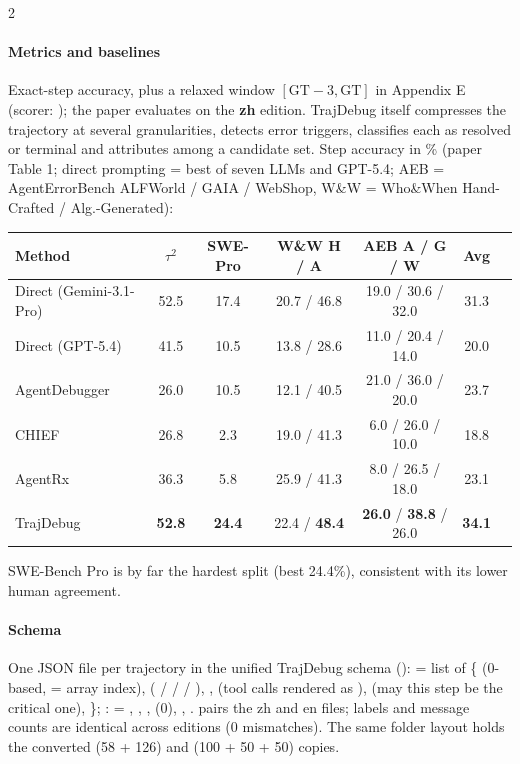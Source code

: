 \begin{multicols}{2}
\paragraph{Metrics and baselines} Exact-step accuracy, plus a relaxed window $[\mathrm{GT}{-}3, \mathrm{GT}]$ in Appendix E (scorer: ); the paper evaluates on the \textbf{zh} edition. TrajDebug itself compresses the trajectory at several granularities, detects error triggers, classifies each as resolved or terminal and attributes among a candidate set. Step accuracy in \% (paper Table 1; direct prompting = best of seven LLMs and GPT-5.4; AEB = AgentErrorBench ALFWorld / GAIA / WebShop, W\&W = Who\&When Hand-Crafted / Alg.-Generated):

\begin{center}\footnotesize\setlength{\tabcolsep}{2pt}
\begin{tabular}{@{}lcccccc@{}}\toprule
Method & $\tau^2$ & SWE-Pro & W\&W H / A & AEB A / G / W & Avg\\\midrule
Direct (Gemini-3.1-Pro) & 52.5 & 17.4 & 20.7 / 46.8 & 19.0 / 30.6 / 32.0 & 31.3\\
Direct (GPT-5.4) & 41.5 & 10.5 & 13.8 / 28.6 & 11.0 / 20.4 / 14.0 & 20.0\\
AgentDebugger & 26.0 & 10.5 & 12.1 / 40.5 & 21.0 / 36.0 / 20.0 & 23.7\\
CHIEF & 26.8 & 2.3 & 19.0 / 41.3 & 6.0 / 26.0 / 10.0 & 18.8\\
AgentRx & 36.3 & 5.8 & 25.9 / 41.3 & 8.0 / 26.5 / 18.0 & 23.1\\
TrajDebug & \textbf{52.8} & \textbf{24.4} & 22.4 / \textbf{48.4} & \textbf{26.0} / \textbf{38.8} / 26.0 & \textbf{34.1}\\\bottomrule
\end{tabular}
\end{center}
SWE-Bench Pro is by far the hardest split (best 24.4\%), consistent with its lower human agreement.

\paragraph{Schema} One JSON file per trajectory in the unified TrajDebug schema ():  = list of \{ (0-based, = array index),  ( /  /  / ), ,  (tool calls rendered as ),  (may this step be the critical one), \}; :  = , , ,  (0), , .  pairs the zh and en files; labels and message counts are identical across editions (0 mismatches). The same folder layout holds the converted  (58 + 126) and  (100 + 50 + 50) copies.
\end{multicols}


